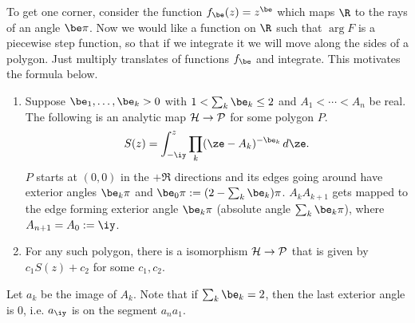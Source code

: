 To get one corner, consider the function $f_\be(z)= z^{\be}$ which maps $\R$ to the rays of an angle $\be\pi$. 
Now we would like a function on $\R$ such that $\arg F$ is a piecewise step function, so that if we integrate it we will move along the sides of a polygon. Just multiply translates of functions $f_\be$ and integrate. This motivates the formula below.
\begin{thm}
\begin{enumerate}
\item
Suppose $\be_1,\ldots, \be_k>0$ with $1<\sum_k \be_k\le 2$ and $A_1<\cdots <A_n$ be real. 
The following is an analytic map $\cal H\to P$ for some polygon $P$.
\[
S(z)=\int_{-\iy}^z\prod_k (\ze-A_k)^{-\be_k}\,d\ze.
\]
$P$ starts at $(0,0)$ in the $+\Re$ directions and its edges going around have exterior angles $\be_k\pi$ and $\be_0\pi:= (2-\sum_k \be_k)\pi$. $A_kA_{k+1}$ gets mapped to the edge forming exterior angle $\be_k\pi$ (absolute angle $\sum_k \be_k\pi$), where $A_{n+1}=A_0:=\iy$.
\item For any such polygon, there is a isomorphism $\cal H\to P$ that is given by $c_1S(z)+c_2$ for some $c_1,c_2$.
\end{enumerate}
\end{thm}
Let $a_k$ be the image of $A_k$. 
Note that if $\sum_k \be_k=2$, then the last exterior angle is 0, i.e. $a_{\iy}$ is on the segment $a_na_1$.
